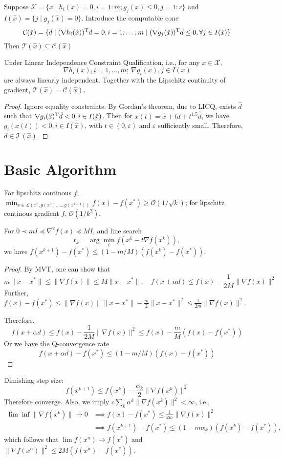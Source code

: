 Suppose $\mathcal{X} = \{x\mid h_i(x)=0, i=1:m; g_j(x)\le0, j=1:r\}$ and $I(\hat{x})=\{j\mid g_j(\hat{x})=0\}$.
Introduce the computable cone
\[
\mathcal{C}(\hat{x})=\{d\mid(\nabla h_i(\hat{x}))^{\mathrm T} d = 0,i=1,\dots,m\mid (\nabla g_j(\hat{x}))^{\mathrm T} d\le0, \forall j\in I(\hat{x})\}
\]
Then $\mathcal{T}(\hat{x})\subseteq\mathcal{C}(\hat{x})$
\begin{proposition}
Under Linear Independence Constraint Qualification, i.e., for any $x\in\mathcal{X}$, 
\[
\nabla h_i(x), i=1,\dots,m;\ \nabla g_i(x), j\in I(x)
\]
are always linearly independent.
Together with the Lipschitz continuity of gradient, $\mathcal{T}(\hat{x})=\mathcal{C}(\hat{x})$.
\end{proposition}
\begin{proof}
Ignore equality constraints. By Gordan's theorem, due to LICQ, exists $\hat{d}$ such that $\nabla g_i(\hat{x})^{\mathrm T}\hat{d}<0,i\in I(\hat{x})$. Then for $x(t) = \hat{x}+td+t^{1.5}\hat{d}$, we have $g_i(x(t))<0,i\in I(\hat{x})$, with $t\in(0,\varepsilon)$ and $\varepsilon$ sufficiently small. Therefore, $d\in\mathcal{T}(\hat{x})$.
\end{proof}

\section{Basic Algorithm}
For lipschitz continous $f$, $\min_{x\in\mathcal{L}(x^0,g(x^0),\dots,g(x^{k-1}))}f(x)-f(x^*)\ge\mathcal{O}(1/\sqrt{k})$; for lipschitz continous gradient $f$, $\mathcal{O}(1/k^2)$.
\begin{theorem}
For $0\prec mI\preceq\nabla^2f(x)\preceq MI$, and line search 
\[
t_k = \arg\min_tf(x^k - t\nabla f(x^k)),
\]
we have $f(x^{k+1}) - f(x^*)\le (1-m/M)(f(x^k) - f(x^*))$.
\end{theorem}
\begin{proof}
By MVT, one can show that 
\[
m\|x - x^*\|\le\|\nabla f(x)\|\le M\|x-x^*\|,\quad
f(x+\alpha d)\le f(x) - \frac{1}{2M}\|\nabla f(x)\|^2
\]
Further, $f(x) - f(x^*)\le \|\nabla f(x)\|\|x-x^*\| - \frac{m}{2}\|x-x^*\|^2\le\frac{1}{2m}\|\nabla f(x)\|^2$.

Therefore,
\[
f(x+\alpha d)\le f(x) - \frac{1}{2M}\|\nabla f(x)\|^2\le f(x) - \frac{m}{M}(f(x) - f(x^*))
\]
Or we have the Q-convergence rate
\[
f(x+\alpha d) - f(x^*)\le (1-m/M)(f(x) - f(x^*))
\]
\end{proof}
Dimishing step size:
\[
f(x^{k+1})\le f(x^k) - \frac{\alpha_k}{2}\|\nabla f(x^k)\|^2
\]
Therefore converge. Also, we imply $c\sum_{k}\alpha^k\|\nabla f(x^k)\|^2<\infty$, i.e.,
\begin{align*}
\lim\inf\|\nabla f(x^k)\|\to0&\implies
f(x) - f(x^*)\le\frac{1}{2m}\|\nabla f(x)\|^2\\
&\implies
f(x^{k+1}) - f(x^*)\le (1-m\alpha_k)(f(x^k) - f(x^*)),
\end{align*}
which follows that $\lim f(x^n)\to f(x^*)$ and $\|\nabla f(x^n)\|^2\le 2M(f(x^n) - f(x^*))$.

